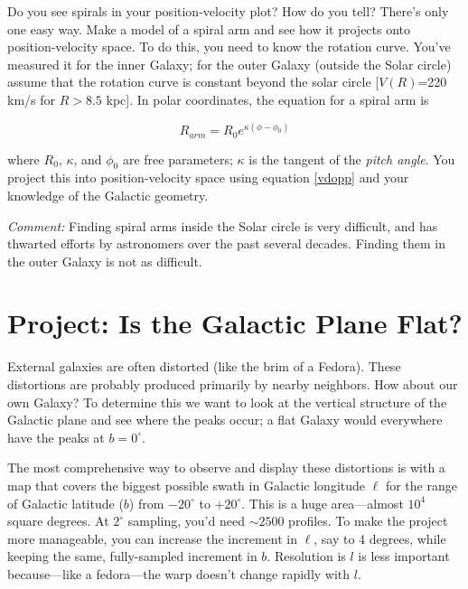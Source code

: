 \documentclass[psfig,preprint]{aastex}
\begin{document}
\begin{enumerate}
	Do you see spirals in your position-velocity plot? How do you
tell? There's only one easy way.  Make a model of a spiral arm and see
how it projects onto position-velocity space.  To do this, you need to
know the rotation curve.  You've measured it for the inner Galaxy; for
the outer Galaxy (outside the Solar circle) assume that the rotation
curve is constant beyond the solar circle [$V(R)$=220 km/s for $R > 8.5$
kpc].  In polar coordinates, the equation for a spiral arm is

\begin{equation}
R_{arm}  =  R_0 e^ {\kappa (\phi - \phi_0)} 
\end{equation}

\noindent where $R_0$, $\kappa$, and $\phi_0$ are free parameters;
$\kappa$ is the tangent of the {\it pitch angle}.  You project this into
position-velocity space using equation \ref{vdopp} and your knowledge of
the Galactic geometry.  

{\it Comment:} Finding spiral arms inside the Solar circle is very
difficult, and has thwarted efforts by astronomers over the past several
decades. Finding them in the outer Galaxy is not as difficult.

\end{enumerate}

\section{Project: Is the Galactic Plane Flat?}

\noindent
External galaxies are often distorted (like the brim of a Fedora). 
These distortions are probably produced primarily by nearby neighbors. 
How about our own Galaxy? To determine this we want to look at the
vertical structure of the Galactic plane and see where the peaks occur;
a flat Galaxy would everywhere have the peaks at $b=0^\circ$. 

The most comprehensive way to observe and display these distortions is
with a map that covers the biggest possible swath in Galactic longitude
$\ell$ for the range of Galactic latitude ($b$) from $-20^\circ$ to
$+20^\circ$. This is a huge area---almost $10^4$ square degrees. At
$2^\circ$ sampling, you'd need $\sim 2500$ profiles.  To make the
project more manageable, you can increase the increment in $\ell$, say
to 4 degrees, while keeping the same, fully-sampled increment in
$b$. Resolution is $l$ is less important because---like a
fedora---the warp doesn't change rapidly with $l$.
\end{document}
